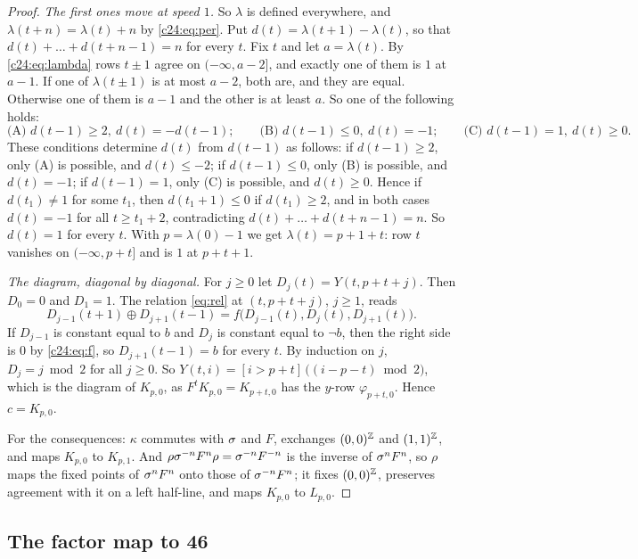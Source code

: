 \begin{proof}
\emph{The first ones move at speed $1$.} So $\lambda$ is defined everywhere, and $\lambda(t+n)=\lambda(t)+n$ by \eqref{c24:eq:per}. Put $d(t)=\lambda(t+1)-\lambda(t)$, so that $d(t)+\dots+d(t+n-1)=n$ for every $t$. Fix $t$ and let $a=\lambda(t)$. By \eqref{c24:eq:lambda} rows $t\pm1$ agree on $(-\infty,a-2]$, and exactly one of them is $1$ at $a-1$. If one of $\lambda(t\pm1)$ is at most $a-2$, both are, and they are equal. Otherwise one of them is $a-1$ and the other is at least $a$. So one of the following holds:
\[
\text{(A) } d(t-1)\ge2,\ d(t)=-d(t-1);\qquad\text{(B) } d(t-1)\le0,\ d(t)=-1;\qquad\text{(C) } d(t-1)=1,\ d(t)\ge0.
\]
These conditions determine $d(t)$ from $d(t-1)$ as follows: if $d(t-1)\ge2$, only (A) is possible, and $d(t)\le-2$; if $d(t-1)\le0$, only (B) is possible, and $d(t)=-1$; if $d(t-1)=1$, only (C) is possible, and $d(t)\ge0$. Hence if $d(t_1)\ne1$ for some $t_1$, then $d(t_1+1)\le0$ if $d(t_1)\ge2$, and in both cases $d(t)=-1$ for all $t\ge t_1+2$, contradicting $d(t)+\dots+d(t+n-1)=n$. So $d(t)=1$ for every $t$. With $p=\lambda(0)-1$ we get $\lambda(t)=p+1+t$: row $t$ vanishes on $(-\infty,p+t]$ and is $1$ at $p+t+1$.

\emph{The diagram, diagonal by diagonal.} For $j\ge0$ let $D_j(t)=Y(t,p+t+j)$. Then $D_0=0$ and $D_1=1$. The relation \eqref{eq:rel} at $(t,p+t+j)$, $j\ge1$, reads
\[
D_{j-1}(t+1)\oplus D_{j+1}(t-1)=f\bigl(D_{j-1}(t),D_j(t),D_{j+1}(t)\bigr).
\]
If $D_{j-1}$ is constant equal to $b$ and $D_j$ is constant equal to $\neg b$, then the right side is $0$ by \eqref{c24:eq:f}, so $D_{j+1}(t-1)=b$ for every $t$. By induction on $j$, $D_j=j\bmod 2$ for all $j\ge0$. So $Y(t,i)=[i>p+t]\,\bigl((i-p-t)\bmod2\bigr)$, which is the diagram of $K_{p,0}$, as $F^tK_{p,0}=K_{p+t,0}$ has the $y$-row $\varphi_{p+t,0}$. Hence $c=K_{p,0}$.

For the consequences: $\kappa$ commutes with $\sigma$ and $F$, exchanges $(0,0)^{\mathbb{Z}}$ and $(1,1)^{\mathbb{Z}}$, and maps $K_{p,0}$ to $K_{p,1}$. And $\rho\sigma^{-n}F^n\rho=\sigma^{-n}F^{-n}$ is the inverse of $\sigma^nF^n$, so $\rho$ maps the fixed points of $\sigma^nF^n$ onto those of $\sigma^{-n}F^n$; it fixes $(0,0)^{\mathbb{Z}}$, preserves agreement with it on a left half-line, and maps $K_{p,0}$ to $L_{p,0}$.
\end{proof}

\subsection{The factor map to 46}\label{c24:sec:delta}

